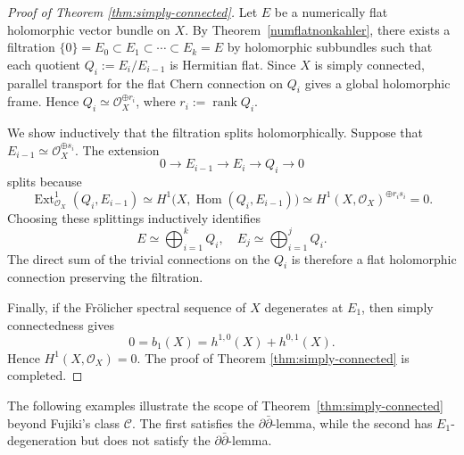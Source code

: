 \documentclass[11pt]{amsart}
\newcommand{\ddbar}{\partial\bar\partial}
\numberwithin{equation}{section}
\theoremstyle{definition}
\theoremstyle{plain}
\theoremstyle{plain}
\theoremstyle{definition}
\theoremstyle{stepstyle}
\begin{document}
	\begin{proof}[{Proof of Theorem \ref{thm:simply-connected}}]
		Let $E$ be a numerically flat holomorphic vector bundle on $X$.
		By Theorem~\ref{numflatnonkahler}, there exists a filtration
		$
		\{0\}=E_0\subset E_1\subset\cdots\subset E_k=E
		$
		by holomorphic subbundles such that each quotient
		$Q_i:=E_i/E_{i-1}$ is Hermitian flat.
		Since $X$ is simply connected, parallel transport for the flat
		Chern connection on $Q_i$ gives a global holomorphic frame.
		Hence $Q_i\simeq\mathcal O_X^{\oplus r_i}$, where
		$r_i:=\operatorname{rank}Q_i.
		$
		
		We show inductively that the filtration splits holomorphically.
		Suppose that
		$E_{i-1}\simeq\mathcal O_X^{\oplus s_i}$.
		The extension
		$$
		0\longrightarrow E_{i-1}\longrightarrow E_i
		\longrightarrow Q_i\longrightarrow0
		$$
		splits because
		$$
		\operatorname{Ext}^1_{\mathcal O_X}(Q_i,E_{i-1})
		\simeq
		H^1\bigl(X,\operatorname{Hom}(Q_i,E_{i-1})\bigr)
		\simeq
		H^1(X,\mathcal O_X)^{\oplus r_i s_i}
		=0.
		$$
		Choosing these splittings inductively identifies
		$$
		E\simeq\bigoplus_{i=1}^k Q_i,
		\quad
		E_j\simeq\bigoplus_{i=1}^j Q_i.
		$$
		The direct sum of the trivial connections on the $Q_i$ is
		therefore a flat holomorphic connection preserving the filtration.
		
		
		Finally, if the Fr\"olicher spectral sequence of $X$ degenerates
		at $E_1$, then simply connectedness gives
		$$
		0=b_1(X)=h^{1,0}(X)+h^{0,1}(X).
		$$
		Hence $H^1(X,\mathcal O_X)=0$. The proof of Theorem \ref{thm:simply-connected} is completed.
	\end{proof}
	
	
	
	The following examples illustrate the scope of
	Theorem~\ref{thm:simply-connected} beyond Fujiki's class
	$\mathcal C$.
	The first satisfies the $\ddbar$-lemma, while the second
	has $E_1$-degeneration but does not satisfy the $\ddbar$-lemma.
	
\end{document}
